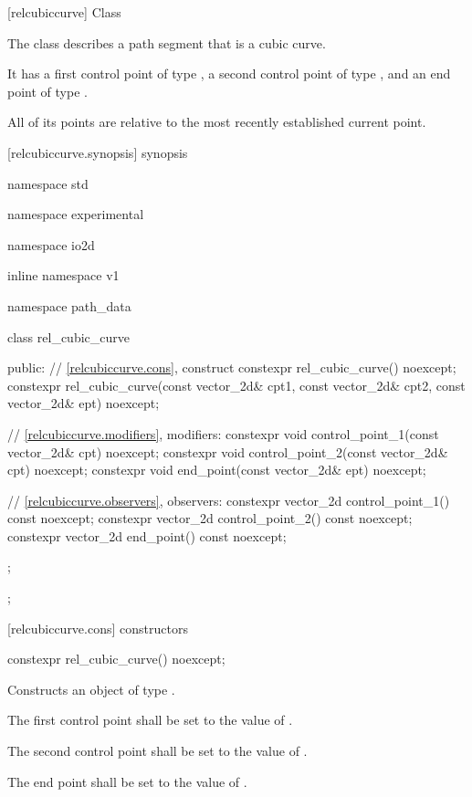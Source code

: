  [relcubiccurve] {Class }

\pnum
{}
The class  describes a path segment that is a cubic \bezierlocal curve.

\pnum
It has a first control point of type , a second control point of type , and an end point of type .

\pnum
All of its points are relative to the most recently established current point.

 [relcubiccurve.synopsis] { synopsis}

\begin{codeblock}
namespace std { namespace experimental { namespace io2d { inline namespace v1 {
  namespace path_data {
    class rel_cubic_curve {
    public:
      // \ref{relcubiccurve.cons}, construct
      constexpr rel_cubic_curve() noexcept;
      constexpr rel_cubic_curve(const vector_2d& cpt1, const vector_2d& cpt2,
        const vector_2d& ept) noexcept;

      // \ref{relcubiccurve.modifiers}, modifiers:
      constexpr void control_point_1(const vector_2d& cpt) noexcept;
      constexpr void control_point_2(const vector_2d& cpt) noexcept;
      constexpr void end_point(const vector_2d& ept) noexcept;

      // \ref{relcubiccurve.observers}, observers:
      constexpr vector_2d control_point_1() const noexcept;
      constexpr vector_2d control_point_2() const noexcept;
      constexpr vector_2d end_point() const noexcept;
    };
  };
} } } }
\end{codeblock}

 [relcubiccurve.cons] { constructors}

\begin{itemdecl}
constexpr rel_cubic_curve() noexcept;
\end{itemdecl}
\begin{itemdescr}
\pnum
\effects
Constructs an object of type .

\pnum
The first control point shall be set to the value of .

\pnum
The second control point shall be set to the value of .

\pnum
The end point shall be set to the value of .
\end{itemdescr}

